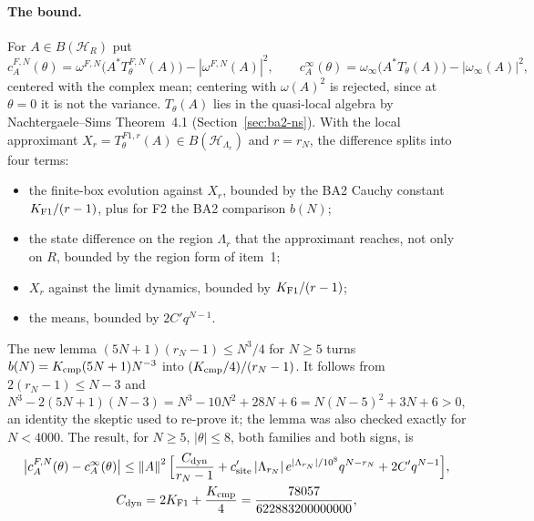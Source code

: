 \paragraph{The bound.} For $A\in B(\mathcal H_R)$ put
\begin{equation}
 c^{F,N}_A(\theta)=\omega^{F,N}\bigl(A^*T^{F,N}_\theta(A)\bigr)-|\omega^{F,N}(A)|^2,\qquad
 c^\infty_A(\theta)=\omega_\infty\bigl(A^*T_\theta(A)\bigr)-|\omega_\infty(A)|^2 ,
 \label{eq:bb2-correlations}
\end{equation}
centered with the complex mean; centering with $\omega(A)^2$ is rejected,
since at $\theta=0$ it is not the variance. $T_\theta(A)$ lies in the
quasi-local algebra by Nachtergaele--Sims Theorem~4.1
(Section~\ref{sec:ba2-ns}). With the local approximant
$X_r=T^{F1,r}_\theta(A)\in B(\mathcal H_{\Lambda_r})$ and $r=r_N$, the
difference splits into four terms:
\begin{itemize}
\item the finite-box evolution against $X_r$, bounded by the BA2 Cauchy
 constant $K_{\rm F1}/(r-1)$, plus for F2 the BA2 comparison $b(N)$;
\item the state difference on the region $\Lambda_r$ that the approximant
 reaches, not only on $R$, bounded by the region form of item~1;
\item $X_r$ against the limit dynamics, bounded by $K_{\rm F1}/(r-1)$;
\item the means, bounded by $2C'q^{N-1}$.
\end{itemize}
The new lemma $(5N+1)(r_N-1)\le N^3/4$ for $N\ge5$ turns
$b(N)=K_{\rm cmp}(5N+1)N^{-3}$ into $(K_{\rm cmp}/4)/(r_N-1)$. It follows from
$2(r_N-1)\le N-3$ and
\begin{equation}
 N^3-2(5N+1)(N-3)=N^3-10N^2+28N+6=N(N-5)^2+3N+6>0 ,
 \label{eq:bb2-lemma}
\end{equation}
an identity the skeptic used to re-prove it; the lemma was also checked
exactly for $N<4000$. The result, for $N\ge5$, $|\theta|\le8$, both families
and both signs, is
\begin{equation}
 \begin{gathered}
 \bigl|c^{F,N}_A(\theta)-c^\infty_A(\theta)\bigr|\le\left\lVert A\right\rVert^2\Bigl[
 \frac{C_{\rm dyn}}{r_N-1}+c'_{\rm site}\,|\Lambda_{r_N}|\,e^{|\Lambda_{r_N}|/10^8}q^{N-r_N}
 +2C'q^{N-1}\Bigr],\\
 C_{\rm dyn}=2K_{\rm F1}+\frac{K_{\rm cmp}}4=\frac{78057}{622883200000000},
 \end{gathered}
 \label{eq:bb2-item5}
\end{equation}
